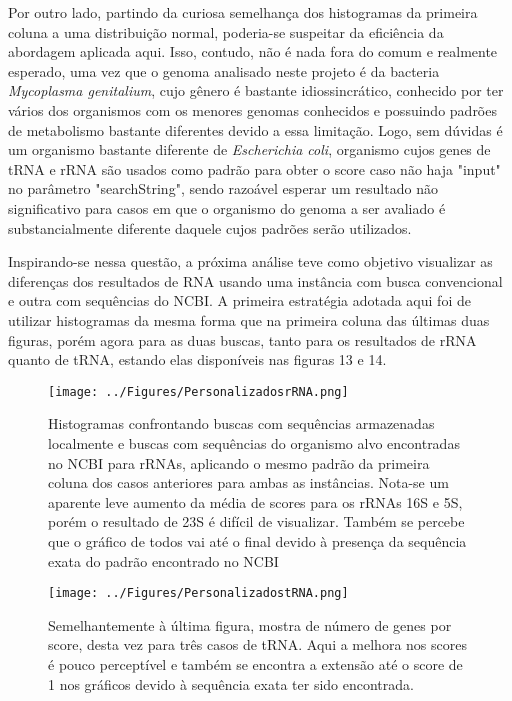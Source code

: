 \documentclass[brazilian,12pt,a4paper,final]{article}
\begin{document}
	\vspace{0.5cm}
	
	Por outro lado, partindo da curiosa semelhança dos histogramas da primeira coluna a uma distribuição normal, poderia-se suspeitar da eficiência da abordagem aplicada aqui. Isso, contudo, não é nada fora do comum e realmente esperado, uma vez que o genoma analisado neste projeto é da bacteria \textit{Mycoplasma genitalium}, cujo gênero é bastante idiossincrático, conhecido por ter vários dos organismos com os menores genomas conhecidos e possuindo padrões de metabolismo bastante diferentes devido a essa limitação. Logo, sem dúvidas é um organismo bastante diferente de \textit{Escherichia coli}, organismo cujos genes de tRNA e rRNA são usados como padrão para obter o score caso não haja "input" no parâmetro "searchString", sendo razoável esperar um resultado não significativo para casos em que o organismo do genoma a ser avaliado é substancialmente diferente daquele cujos padrões serão utilizados.
	
	\vspace{0.5cm}
	
	
	Inspirando-se nessa questão, a próxima análise teve como objetivo visualizar as diferenças dos resultados de RNA usando uma instância com busca convencional e outra com sequências do NCBI. A primeira estratégia adotada aqui foi de utilizar histogramas da mesma forma que na primeira coluna das últimas duas figuras, porém agora para as duas buscas, tanto para os resultados de rRNA quanto de tRNA, estando elas disponíveis nas figuras 13 e 14.
	
	\vspace{0.5cm}
	
	\begin{figure}[hbtp]
		\begin{center}
			\texttt{[image: ../Figures/PersonalizadosrRNA.png]}
			\caption{Histogramas confrontando buscas com sequências armazenadas localmente e buscas com sequências do organismo alvo encontradas no NCBI para rRNAs, aplicando o mesmo padrão da primeira coluna dos casos anteriores para ambas as instâncias. Nota-se um aparente leve aumento da média de scores para os rRNAs 16S e 5S, porém o resultado de 23S é difícil de visualizar. Também se percebe que o gráfico de todos vai até o final devido à presença da sequência exata do padrão encontrado no NCBI }
			\label{fig}
		\end{center}
	\end{figure}
	
	\begin{figure}[hbtp]
		\begin{center}
			\texttt{[image: ../Figures/PersonalizadostRNA.png]}
			\caption{Semelhantemente à última figura, mostra de número de genes por score, desta vez para três casos de tRNA. Aqui a melhora nos scores é pouco perceptível e também se encontra a extensão até o score de 1 nos gráficos devido à sequência exata ter sido encontrada.}
			\label{fig}
		\end{center}
	\end{figure}
	
\end{document}
